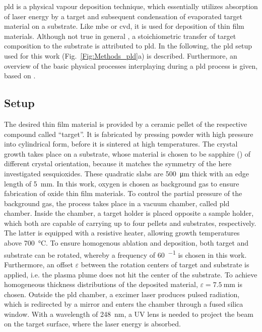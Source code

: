 \gls{pld} is a physical vapour deposition technique, which essentially utilizes absorption of laser energy by a target and subsequent condensation of evaporated target material on a substrate.
Like \gls{mbe} or \gls{cvd}, it is used for deposition of thin film materials.
Although not true in general \cite{lorenz2019}, a stoichiometric transfer of target composition to the substrate is attributed to \gls{pld}.
In the following, the \gls{pld} setup used for this work (Fig.~\ref{Fig:Methods_pld}a) is described.
Furthermore, an overview of the basic physical processes interplaying during a \gls{pld} process is given, based on \textcite{lorenz2019}.

\subsection{Setup}\label{Sec:Methods_pld}
The desired thin film material is provided by a ceramic pellet of the respective compound called \enquote{target}.
It is fabricated by pressing powder with high pressure into cylindrical form, before it is sintered at high temperatures.
The crystal growth takes place on a substrate, whose material is chosen to be sapphire () of different crystal orientation, because it matches the symmetry of the here investigated sesquioxides.
These quadratic slabs are \qty{500}{\um} thick with an edge length of \qty{5}{\mm}.
%
In this work, oxygen is chosen as background gas to ensure fabrication of oxide thin film materials.
To control the partial pressure of the background gas, the process takes place in a vacuum chamber, called \gls{pld} chamber.
Inside the chamber, a target holder is placed opposite a sample holder, which both are capable of carrying up to four pellets and substrates, respectively.
The latter is equipped with a resistive heater, allowing growth temperatures above \qty{700}{\celsius}.
To ensure homogenous ablation and deposition, both target and substrate can be rotated, whereby a frequency of \qty{60}{\min^{-1}} is chosen in this work.
Furthermore, an offset $\varepsilon$ between the rotation centers of target and substrate is applied, i.e. the plasma plume does not hit the center of the substrate.
To achieve homogeneous thickness distributions of the deposited material, $\varepsilon=\qty{7.5}{\mm}$ is chosen.
Outside the \gls{pld} chamber, a  excimer laser produces pulsed radiation, which is redirected by a mirror and enters the chamber through a fused silica window.
With a wavelength of \qty{248}{\nm}, a UV lens is needed to project the beam on the target surface, where the laser energy is absorbed.
